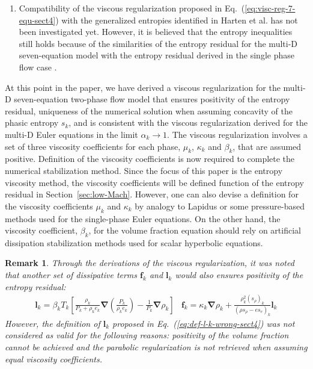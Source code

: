\documentclass[preprint,10pt]{elsarticle}
\newcommand{\grad}{\mbold{\nabla}}
\newcommand{\mbold}[1]{\boldsymbol#1}
\newtheorem*{remark}{Remark}
\newcommand{\eqt}[1]{Eq.~(\ref{#1})}                     %
\newcommand{\sct}[1]{Section~\ref{#1}}                   %
\newcommand{\tcr}[1]{\textcolor{red}{#1}}
\newcommand{\tcb}[1]{\textcolor{blue}{#1}}
\begin{document}
\begin{enumerate}
\item{Compatibility of the viscous regularization proposed in \eqt{eq:visc-reg-7-equ-sect4} with the generalized entropies identified in Harten et al. \cite{Harten} has not been investigated yet. However, it is believed that the entropy inequalities still holds because of the similarities of the entropy residual for the multi-D seven-equation model with the entropy residual derived in the single phase flow case \cite{jlg}.} 
\end{enumerate}
%
At this point in the paper, we have derived a viscous regularization for the multi-D seven-equation two-phase flow model that ensures positivity of the entropy residual, uniqueness of the numerical solution when assuming concavity of the phasic entropy $s_k$, and is consistent with the viscous regularization derived for the multi-D Euler equations \cite{jlg, Marco_paper_low_mach} in the limit $\alpha_k \to 1$. The viscous regularization involves a set of three viscosity coefficients for each phase, $\mu_k$, $\kappa_k$ and $\beta_k$, that are assumed positive. Definition of the viscosity coefficients is now required to complete the numerical stabilization method. Since the focus of this paper is the entropy viscosity method, the viscosity coefficients will be defined function of the entropy residual in \sct{sec:low-Mach}. However, one can also devise a definition for the viscosity coefficients $\mu_k$ and $\kappa_k$ by analogy to Lapidus \cite{Lapidus_paper, Lapidus_book} or some pressure-based methods \cite{PBV_book} used for the single-phase Euler equations. On the other hand, the viscosity coefficient, $\beta_k$, for the volume fraction equation should rely on artificial dissipation stabilization methods used for scalar hyperbolic equations. 
%
\begin{remark}
Through the derivations of the viscous regularization, it was noted that another set of dissipative terms $\mbold f_k$ and $\mbold l_k$ would also ensures positivity of the entropy residual:
%
\begin{subequations}
\begin{align}\label{eq:def-l-k-wrong-sect4}
\mbold l_k =\beta_k T_k \left[ \frac{\rho_k}{P_k+\rho_k e_k} \grad \left( \frac{P_k}{\rho_k e_k} \right) - \frac{1}{P_k} \grad \rho_k \right]
\end{align}
\begin{align}
\mbold f_k = \kappa_k \grad \rho_k +  \frac{\rho^2_k (s_{\rho})_k}{\left( \rho s_{\rho} - e s_e \right)_k} \mbold l_k
\end{align}
\end{subequations}
%
However, the definition of $\mbold l_k$ proposed in \eqt{eq:def-l-k-wrong-sect4} was not considered as valid for the following reasons: positivity of the volume fraction cannot be achieved and the parabolic regularization is not retrieved when assuming equal viscosity coefficients.
\end{remark}
%
\end{document}
